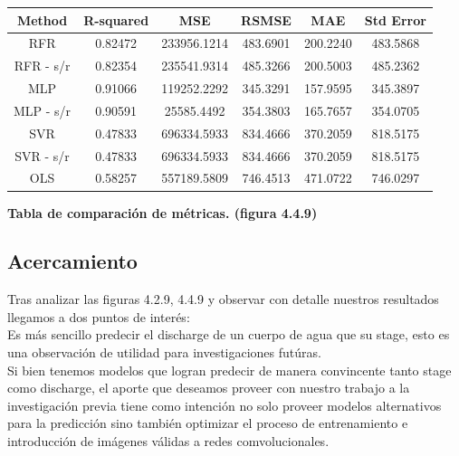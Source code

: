 \documentclass{article}
\begin{document}
        \begin{tabular}{|c|c|c|c|c|c|}
            \hline
            Method  &   R-squared  & MSE & RSMSE & MAE & Std Error  \\
            \hline
            RFR & 0.82472 & 233956.1214 & 483.6901 & 200.2240 &   483.5868\\
            \hline
            RFR - s/r  & 0.82354 & 235541.9314 & 485.3266 & 200.5003 &  485.2362\\
            \hline
            MLP & 0.91066 & 119252.2292 & 345.3291 & 157.9595 & 345.3897 \\
            \hline
            MLP - s/r & 0.90591 & 25585.4492 & 354.3803 & 165.7657 & 354.0705 \\
            \hline
            SVR & 0.47833 & 696334.5933 & 834.4666 & 370.2059 & 818.5175 \\
            \hline
            SVR - s/r & 0.47833 & 696334.5933 & 834.4666 & 370.2059 & 818.5175 \\
            \hline
            OLS & 0.58257 & 557189.5809 & 746.4513 & 471.0722 & 746.0297 \\
            \hline
        
        \end{tabular}
        
        \begin{center}
                    \textbf{Tabla de comparación de métricas. (figura 4.4.9)}
        \end{center}

    \subsection{Acercamiento}
    
        Tras analizar las figuras 4.2.9, 4.4.9 y observar con detalle nuestros resultados llegamos a dos puntos de interés:\\
        
        Es más sencillo predecir el discharge de un cuerpo de agua que su stage, esto es una observación de utilidad para investigaciones futúras.\\
            
        Si bien tenemos modelos que logran predecir de manera convincente tanto stage como discharge, el aporte que deseamos proveer con nuestro trabajo a la investigación previa tiene como intención no solo proveer modelos alternativos para la predicción sino también optimizar el proceso de entrenamiento e introducción de imágenes válidas a redes comvolucionales. 
\end{document}
